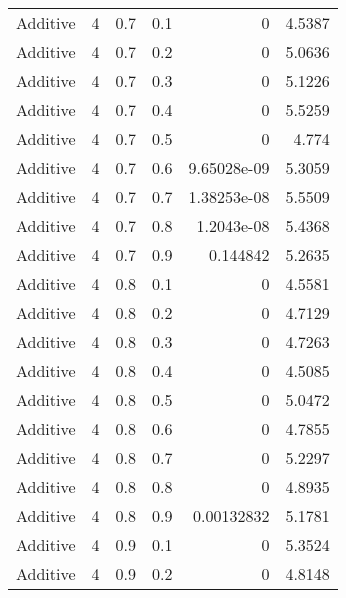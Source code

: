 \documentclass{article}
\begin{document}
\begin{longtable}[H]{lrrrrr}
 Additive       &       4 &   0.7 &            0.1 &      0           &          4.5387 \\
 Additive       &       4 &   0.7 &            0.2 &      0           &          5.0636 \\
 Additive       &       4 &   0.7 &            0.3 &      0           &          5.1226 \\
 Additive       &       4 &   0.7 &            0.4 &      0           &          5.5259 \\
 Additive       &       4 &   0.7 &            0.5 &      0           &          4.774  \\
 Additive       &       4 &   0.7 &            0.6 &      9.65028e-09 &          5.3059 \\
 Additive       &       4 &   0.7 &            0.7 &      1.38253e-08 &          5.5509 \\
 Additive       &       4 &   0.7 &            0.8 &      1.2043e-08  &          5.4368 \\
 Additive       &       4 &   0.7 &            0.9 &      0.144842    &          5.2635 \\
 Additive       &       4 &   0.8 &            0.1 &      0           &          4.5581 \\
 Additive       &       4 &   0.8 &            0.2 &      0           &          4.7129 \\
 Additive       &       4 &   0.8 &            0.3 &      0           &          4.7263 \\
 Additive       &       4 &   0.8 &            0.4 &      0           &          4.5085 \\
 Additive       &       4 &   0.8 &            0.5 &      0           &          5.0472 \\
 Additive       &       4 &   0.8 &            0.6 &      0           &          4.7855 \\
 Additive       &       4 &   0.8 &            0.7 &      0           &          5.2297 \\
 Additive       &       4 &   0.8 &            0.8 &      0           &          4.8935 \\
 Additive       &       4 &   0.8 &            0.9 &      0.00132832  &          5.1781 \\
 Additive       &       4 &   0.9 &            0.1 &      0           &          5.3524 \\
 Additive       &       4 &   0.9 &            0.2 &      0           &          4.8148 \\

\end{longtable}
\end{document}
